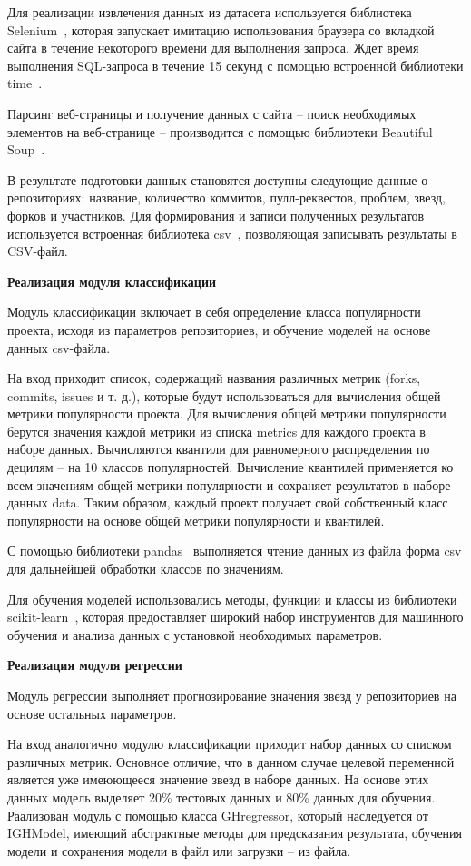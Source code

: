 Для реализации извлечения данных из датасета используется библиотека Selenium~\cite{selenium}, которая запускает имитацию использования браузера со вкладкой сайта в течение некоторого времени для выполнения запроса. Ждет время выполнения SQL-запроса в течение 15 секунд с помощью встроенной библиотеки time~\cite{time}. 

Парсинг веб-страницы и получение данных с сайта -- поиск необходимых элементов на веб-странице -- производится с помощью библиотеки Beautiful Soup~\cite{beautifulsoup}. 

В результате подготовки данных становятся доступны следующие данные о репозиториях: название, количество коммитов, пулл-реквестов, проблем, звезд, форков и участников. Для формирования и записи полученных результатов используется встроенная библиотека csv~\cite{csv}, позволяющая записывать результаты в CSV-файл.

\textbf{Реализация модуля классификации}

Модуль классификации включает в себя определение класса популярности проекта, исходя из параметров репозиториев, и обучение моделей на основе данных csv-файла.

На вход приходит список, содержащий названия различных метрик (forks, commits, issues и т. д.), которые будут использоваться для вычисления общей метрики популярности проекта. Для вычисления общей метрики популярности берутся значения каждой метрики из списка metrics для каждого проекта в наборе данных. Вычисляются квантили для равномерного распределения по децилям -- на 10 классов популярностей. Вычисление квантилей применяется ко всем значениям общей метрики популярности и сохраняет результатов в наборе данных data. Таким образом, каждый проект получает свой собственный класс популярности на основе общей метрики популярности и квантилей.

С помощью библиотеки pandas~\cite{pandas} выполняется чтение данных из файла форма csv для дальнейшей обработки классов по значениям. 

Для обучения моделей использовались методы, функции и классы из библиотеки scikit-learn~\cite{sklearn}, которая  предоставляет широкий набор инструментов для машинного обучения и анализа данных с установкой необходимых параметров.

\textbf{Реализация модуля регрессии}

Модуль регрессии выполняет прогнозирование значения звезд у репозиториев на основе остальных параметров.

На вход аналогично модулю классификации приходит набор данных со списком различных метрик. Основное отличие, что в данном случае целевой переменной является уже имеюющееся значение звезд в наборе данных. На основе этих данных модель выделяет 20\% тестовых данных и 80\% данных для обучения. Раализован модуль с помощью класса GHregressor, который наследуется от IGHModel, имеющий абстрактные методы для предсказания результата, обучения модели и сохранения модели в файл или загрузки -- из файла. 

